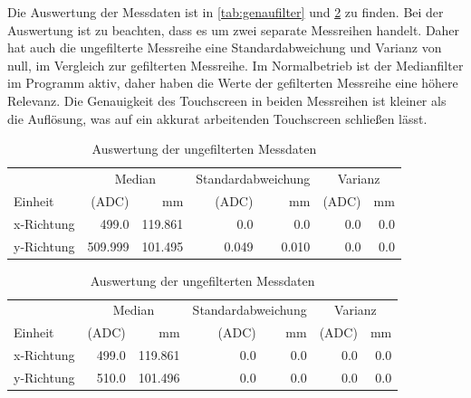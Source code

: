 Die Auswertung der Messdaten ist in \cref{tab:genaufilter} und \cref{tab:genauunfilter} zu finden.
Bei der Auswertung ist zu beachten, dass es um zwei separate Messreihen handelt.
Daher hat auch die ungefilterte Messreihe eine Standardabweichung und Varianz von null, im Vergleich zur gefilterten Messreihe.
Im Normalbetrieb ist der Medianfilter im Programm aktiv, daher haben die Werte der gefilterten Messreihe eine höhere Relevanz.
Die Genauigkeit des Touchscreen in beiden Messreihen ist kleiner als die Auflösung, was auf ein akkurat arbeitenden Touchscreen schließen lässt.
\begin{table}[ht!]
    \caption{Auswertung der gefilterten Messdaten }
    \begin{center}
        \begin{tabular}{@{}lrrrrrr@{} }
            \toprule&\multicolumn{2}{c}{Median}& \multicolumn{2}{c}{Standardabweichung}&\multicolumn{2}{c}{Varianz} \\ 
            Einheit    &(ADC)              &mm             &(ADC)          &mm             &(ADC)      &mm\\\midrule
            x-Richtung & \SI{499,0}{}      & \SI{119,861}{}&\SI{0,0}{}     &\SI{0,0}{}     &\SI{0,0}{} & \SI{0,0}{} \\  
            y-Richtung & \SI{509,999}{}    & \SI{101,495}{}&\SI{0,049}{}   &\SI{0,010}{}   &\SI{0,0}{} & \SI{0,0}{} \\ \bottomrule
        \end{tabular}
        \label{tab:genaufilter}
    \end{center}   
    \caption{Auswertung der ungefilterten Messdaten}
    \begin{center}
        \begin{tabular}{@{}lrrrrrr@{} }
            \toprule&\multicolumn{2}{c}{Median}& \multicolumn{2}{c}{Standardabweichung}&\multicolumn{2}{c}{Varianz} \\ 
            Einheit    &(ADC)              &mm             &(ADC)          &mm             &(ADC)      &mm\\\midrule
            x-Richtung & \SI{499,0}{} & \SI{119,861}{}&\SI{0,0}{}&\SI{0,0}{}&\SI{0,0}{} & \SI{0,0}{} \\  
            y-Richtung & \SI{510,0}{} & \SI{101,496}{}&\SI{0,0}{}&\SI{0,0}{}&\SI{0,0}{} & \SI{0,0}{} \\ \bottomrule
        \end{tabular}
        \label{tab:genauunfilter}
    \end{center}   
\end{table}



